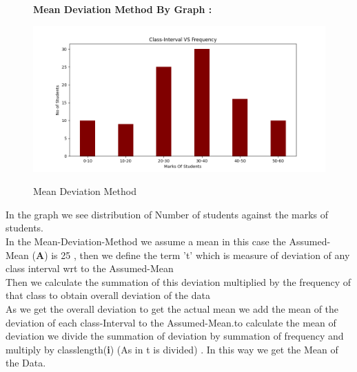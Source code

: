\documentclass[12pt, a4paper, twocolumn]{article}
\begin{document}
\begin{figure}[h]
\centering
\textbf{Mean Deviation Method By Graph :}
\caption{Mean Deviation Method}
\includegraphics[width=\columnwidth]{Assig-1-figure.png}
\label{Fig1}
\end{figure}
In the graph we see distribution of Number of students against the marks of students.\\In the Mean-Deviation-Method we assume a mean in this case the Assumed-Mean (\textbf{A}) is 25 , then we define the term 't' which is measure of deviation of any class interval wrt to the Assumed-Mean \\Then we calculate the summation of this deviation multiplied by the frequency of that class to obtain overall deviation of the data \\As we get the overall deviation to get the actual mean we add the mean of the deviation of each class-Interval to the Assumed-Mean.to calculate the mean of deviation we divide the summation of deviation by summation of frequency and multiply by classlength(\textbf{i}) (As in t is divided) . In this way we get the Mean of the Data.
\end{document}
